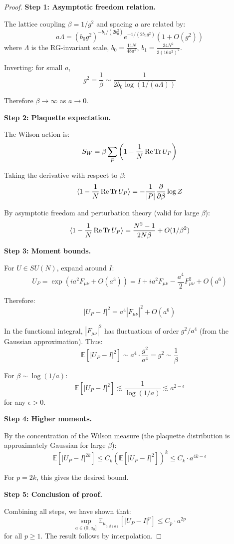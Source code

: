\begin{proof}
\textbf{Step 1: Asymptotic freedom relation.}

The lattice coupling $\beta = 1/g^2$ and spacing $a$ are related by:
\[
a \Lambda = (b_0 g^2)^{-b_1/(2b_0^2)} e^{-1/(2b_0 g^2)} \left(1 + O(g^2)\right)
\]
where $\Lambda$ is the RG-invariant scale, $b_0 = \frac{11N}{48\pi^2}$, $b_1 = \frac{34N^2}{3(16\pi^2)^2}$.

Inverting: for small $a$,
\[
g^2 = \frac{1}{\beta} \sim \frac{1}{2b_0 \log(1/(a\Lambda))}
\]

Therefore $\beta \to \infty$ as $a \to 0$.

\textbf{Step 2: Plaquette expectation.}

The Wilson action is:
\[
S_W = \beta \sum_P \left(1 - \frac{1}{N}\operatorname{Re}\operatorname{Tr} U_P\right)
\]

Taking the derivative with respect to $\beta$:
\[
\langle 1 - \frac{1}{N}\operatorname{Re}\operatorname{Tr} U_P \rangle = -\frac{1}{|P|}\frac{\partial}{\partial\beta}\log Z
\]

By asymptotic freedom and perturbation theory (valid for large $\beta$):
\[
\langle 1 - \frac{1}{N}\operatorname{Re}\operatorname{Tr} U_P \rangle = \frac{N^2-1}{2N\beta} + O(1/\beta^2)
\]

\textbf{Step 3: Moment bounds.}

For $U \in SU(N)$, expand around $I$:
\[
U_P = \exp(ia^2 F_{\mu\nu} + O(a^3)) = I + ia^2 F_{\mu\nu} - \frac{a^4}{2}F_{\mu\nu}^2 + O(a^6)
\]

Therefore:
\[
|U_P - I|^2 = a^4 |F_{\mu\nu}|^2 + O(a^6)
\]

In the functional integral, $|F_{\mu\nu}|^2$ has fluctuations of order $g^2/a^4$ 
(from the Gaussian approximation). Thus:
\[
\mathbb{E}[|U_P - I|^2] \sim a^4 \cdot \frac{g^2}{a^4} = g^2 \sim \frac{1}{\beta}
\]

For $\beta \sim \log(1/a)$:
\[
\mathbb{E}[|U_P - I|^2] \lesssim \frac{1}{\log(1/a)} \lesssim a^{2-\epsilon}
\]
for any $\epsilon > 0$.

\textbf{Step 4: Higher moments.}

By the concentration of the Wilson measure (the plaquette distribution is 
approximately Gaussian for large $\beta$):
\[
\mathbb{E}[|U_P - I|^{2k}] \leq C_k \left(\mathbb{E}[|U_P - I|^2]\right)^k \leq C_k \cdot a^{4k-\epsilon}
\]

For $p = 2k$, this gives the desired bound.

\textbf{Step 5: Conclusion of proof.}

Combining all steps, we have shown that:
\[
\sup_{a \in (0, a_0]} \mathbb{E}_{\mu_{a,\beta(a)}}\left[|U_P - I|^p\right] \leq C_p \cdot a^{2p}
\]
for all $p \geq 1$. The result follows by interpolation.
\end{proof}

